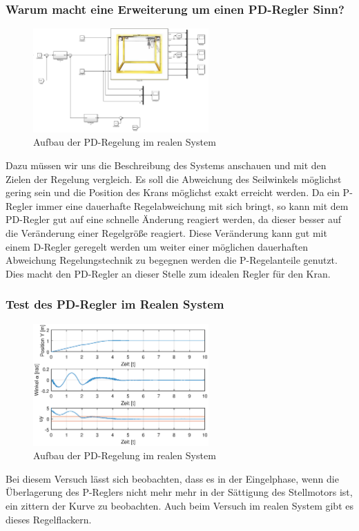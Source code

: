 \documentclass[10pt]{scrartcl}
\begin{document}
\subsubsection{Warum macht eine Erweiterung um einen PD-Regler Sinn?}
\begin{figure}[H]
	\centering
	\includegraphics[width=0.6\textwidth]{PDRegler.png}
	\caption{Aufbau der PD-Regelung im realen System}
	\label{img:grafik-dummy}
\end{figure}
Dazu müssen wir uns die Beschreibung des Systems anschauen und mit den Zielen der Regelung vergleich. Es soll die Abweichung des Seilwinkels möglichst gering sein und die Position des Krans möglichst exakt erreicht werden. Da ein P-Regler immer eine dauerhafte Regelabweichung mit sich bringt, so kann mit dem PD-Regler gut auf eine schnelle Änderung reagiert werden, da dieser besser auf die Veränderung einer Regelgröße reagiert. Diese Veränderung kann gut mit einem D-Regler geregelt werden um weiter einer möglichen dauerhaften Abweichung Regelungstechnik zu begegnen werden die P-Regelanteile genutzt. Dies macht den PD-Regler an dieser Stelle zum idealen Regler für den Kran.

\subsubsection{Test des PD-Regler im Realen System}
\begin{figure}[H]
	\centering
	\includegraphics[width=0.6\textwidth]{PD-ReglerTestReal}
	\caption{Aufbau der PD-Regelung im realen System}
	\label{img:grafik-dummy}
\end{figure}
Bei diesem Versuch lässt sich beobachten, dass es in der Eingelphase, wenn die Überlagerung des P-Reglers nicht mehr mehr in der Sättigung des Stellmotors ist, ein zittern der Kurve zu beobachten. Auch beim Versuch im realen System gibt es dieses Regelflackern.
\end{document}
